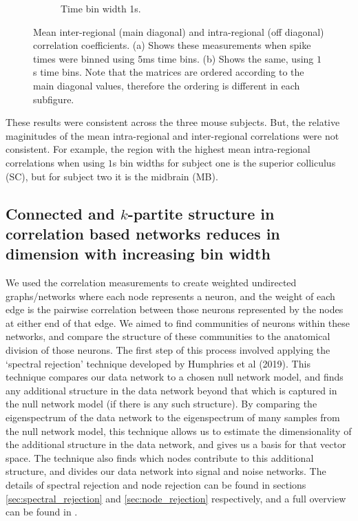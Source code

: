 \documentclass[a4paper,12pt]{article}
\theoremstyle{definition}
\begin{document}
\begin{figure}[h]
\begin{subfigure}[h]{0.5\linewidth}
      \caption{Time bin width 1s.}
      \label{fig:long_bin_corr_matrix}
    \end{subfigure}
    \caption{Mean inter-regional (main diagonal) and intra-regional (off diagonal) correlation coefficients. (a) Shows these measurements when spike times were binned using $5$ms time bins. (b) Shows the same, using $1$s time bins. Note that the matrices are ordered according to the main diagonal values, therefore the ordering is different in each subfigure.}
    \label{fig:corr_matrices}
  \end{figure}

  These results were consistent across the three mouse subjects. But, the relative maginitudes of the mean intra-regional and inter-regional correlations were not consistent. For example, the region with the highest mean intra-regional correlations when using $1$s bin widths for subject one is the superior colliculus (SC), but for subject two it is the midbrain (MB).

  \subsection{Connected and $k$-partite structure in correlation based networks reduces in dimension with increasing bin width}\label{sec:dims_result}
  We used the correlation measurements to create weighted undirected graphs/networks where each node represents a neuron, and the weight of each edge is the pairwise correlation between those neurons represented by the nodes at either end of that edge. We aimed to find communities of neurons within these networks, and compare the structure of these communities to the anatomical division of those neurons. The first step of this process involved applying the `spectral rejection' technique developed by Humphries et al (2019)\cite{humphries}. This technique compares our data network to a chosen null network model, and finds any additional structure in the data network beyond that which is captured in the null network model (if there is any such structure). By comparing the eigenspectrum of the data network to the eigenspectrum of many samples from the null network model, this technique allows us to estimate the dimensionality of the additional structure in the data network, and gives us a basis for that vector space. The technique also finds which nodes contribute to this additional structure, and divides our data network into signal and noise networks. The details of spectral rejection and node rejection can be found in sections \ref{sec:spectral_rejection} and \ref{sec:node_rejection} respectively, and a full overview can be found in \cite{humphries}.
\end{document}
